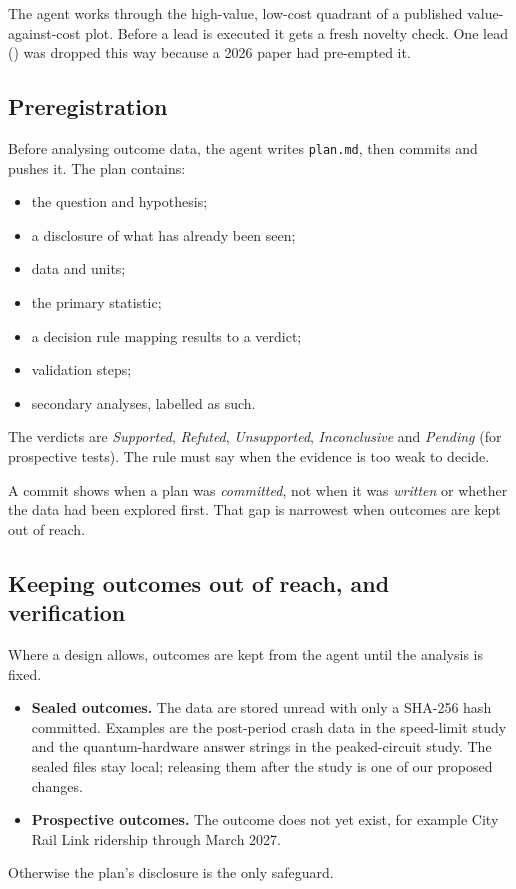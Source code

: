 \documentclass[11pt]{article}
\begin{document}
The agent works through the high-value, low-cost quadrant of a published value-against-cost plot. Before a lead is
executed it gets a fresh novelty check. One lead () was dropped this
way because a 2026 paper had pre-empted it.

\subsection{Preregistration}

Before analysing outcome data, the agent writes \texttt{plan.md}, then commits and pushes it. The plan contains:
\begin{itemize}
\item the question and hypothesis;
\item a disclosure of what has already been seen;
\item data and units;
\item the primary statistic;
\item a decision rule mapping results to a verdict;
\item validation steps;
\item secondary analyses, labelled as such.
\end{itemize}

The verdicts are \emph{Supported}, \emph{Refuted}, \emph{Unsupported}, \emph{Inconclusive} and \emph{Pending} (for
prospective tests). The rule must say when the evidence is too weak to decide.

A commit shows when a plan was \emph{committed}, not when it was \emph{written} or whether the data had been explored
first. That gap is narrowest when outcomes are kept out of reach.

\subsection{Keeping outcomes out of reach, and verification}

Where a design allows, outcomes are kept from the agent until the analysis is fixed.
\begin{itemize}
\item \textbf{Sealed outcomes.} The data are stored unread with only a SHA-256 hash committed. Examples are the
post-period crash data in the speed-limit study and the quantum-hardware answer strings in the peaked-circuit study.
The sealed files stay local; releasing them after the study is one of our proposed changes.
\item \textbf{Prospective outcomes.} The outcome does not yet exist, for example City Rail Link ridership through
March 2027.
\end{itemize}
Otherwise the plan's disclosure is the only safeguard.
\end{document}
